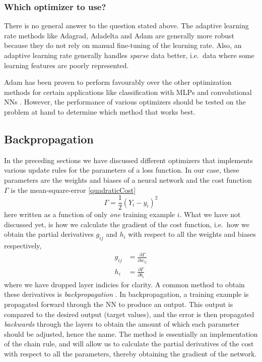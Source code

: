\documentclass[twoside,english]{uiofysmaster}
\begin{document}
\subsubsection{Which optimizer to use?}
There is no general answer to the question stated above. The adaptive learning rate methods
like Adagrad, Adadelta and Adam are generally more robust because they do not rely on manual fine-tuning of the learning rate. 
Also, an adaptive learning rate generally handles \textit{sparse} data better, i.e.\ data where some learning features
are poorly represented. 

Adam has been proven to perform favourably over the other optimization methods for certain applications like classification
with MLPs and convolutional NNs \cite{Kingma14}. However, the performance of various optimizers should be tested on 
the problem at hand to determine which method that works best. 




\subsection{Backpropagation} \label{sec:backprop}
In the preceding sections we have discussed different optimizers that implements various update rules for 
the parameters of a loss function. In our case, these parameters are the weights and biases of a neural network
and the cost function $\Gamma$ is the mean-square-error \eqref{quadraticCost}
\begin{equation}
 \Gamma = \frac{1}{2} (Y_i - y_i)^2
\end{equation}
here written as a function of only \textit{one} training example $i$. 
What we have not discussed yet, is
how we calculate the gradient of the cost function, i.e.\ how we obtain the partial derivatives $g_{ij}$ and $h_i$ 
with respect to all the weights and biases respectively,
\begin{align}
 g_{ij} &= \frac{\partial \Gamma}{\partial w_{ij}} \label{weightDerivative} \\
 h_i &= \frac{\partial \Gamma}{\partial b_i} \label{biasDerivative}
\end{align}
where we have dropped layer indicies for clarity. 
A common method to obtain these derivatives is \textit{backpropagation} \cite{Rumelhart86}. 
In backpropagation, a training example is propagated forward through the NN to produce an output. 
This output is compared to the desired output (target values), and the error is then propagated \textit{backwards}
through the layers to obtain the amount of which each parameter should be adjusted, 
hence the name.
The method is essentially an implementation of the chain rule, and will allow us to calculate
the partial derivatives of the cost with respect to all the parameters, thereby obtaining the gradient of the network. 
\end{document}
